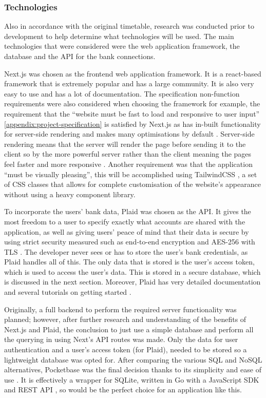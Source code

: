 \subsubsection{Technologies}
Also in accordance with the original timetable, research was conducted prior to development to help determine what technologies will be used. The main technologies that were considered were the web application framework, the database and the API for the bank connections.

Next.js was chosen as the frontend web application framework. It is a react-based framework that is extremely popular and has a large community. It is also very easy to use and has a lot of documentation. The specification non-function requirements were also considered when choosing the framework for example, the requirement that the ``website must be fast to load and responsive to user input'' \ref{appendix:project-specification} is satisfied by Next.js as has in-built functionality for server-side rendering and makes many optimisations by default \cite{NextjsPerformance}. Server-side rendering means that the server will render the page before sending it to the client so by the more powerful server rather than the client meaning the pages feel faster and more responsive \cite{SSR}. Another requirement was that the application ``must be visually pleasing'', this will be accomplished using TailwindCSS \cite{TailwindCSS}, a set of CSS classes that allows for complete customisation of the website's appearance without using a heavy component library.

To incorporate the users' bank data, Plaid \cite{Plaid} was chosen as the API. It gives the most freedom to a user to specify exactly what accounts are shared with the application, as well as giving users' peace of mind that their data is secure by using strict security measured such as end-to-end encryption and AES-256 with TLS \cite{Plaid}. The developer never sees or has to store the user's bank credentials, as Plaid handles all of this. The only data that is stored is the user's access token, which is used to access the user's data. This is stored in a secure database, which is discussed in the next section. Moreover, Plaid has very detailed documentation and several tutorials on getting started \cite{PlaidGettingStarted}.

Originally, a full backend to perform the required server functionality was planned; however, after further research and understanding of the benefits of Next.js and Plaid, the conclusion to just use a simple database and perform all the querying in using Next's API routes was made. Only the data for user authentication and a user's access token (for Plaid), needed to be stored so a lightweight database was opted for. After comparing the various SQL and NoSQL alternatives, Pocketbase was the final decision thanks to its simplicity and ease of use \cite{NoBackendsPocketbase}. It is effectively a wrapper for SQLite, written in Go with a JavaScript SDK and REST API \cite{PocketbaseJavaScriptSDK}, so would be the perfect choice for an application like this.

